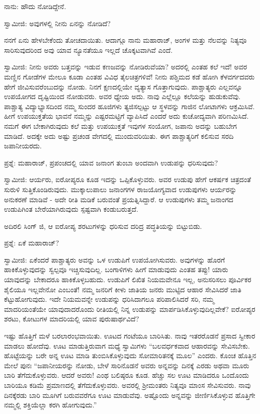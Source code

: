 ನಾನು: ಹೌದು ನೋಡಿದ್ದೇನೆ.

ಸ್ವಾಮೀಜಿ: ಅವುಗಳಲ್ಲಿ ನೀನು ಏನನ್ನು ನೋಡಿದೆ?

ನನಗೆ ಏನು ಹೇಳಬೇಕೆಂದು ತೋಚದಾಯಿತು. ಆದಾಗ್ಗೂ ನಾನು ಮಹಾರಾಜ್, ಅಂಗಳ ಮತ್ತು ನೆಲವನ್ನು ನಿತ್ಯವೂ ಸಾರಿಸುವುದರಿಂದ ಅವು ಯಾವ ನ್ಯೂನತೆಯೂ ಇಲ್ಲದೆ ಚೊಕ್ಕಟವಾಗಿವೆ ಎಂದೆ.

ಸ್ವಾಮೀಜಿ: ನೀನು ಅವರು ಬತ್ತವನ್ನು ಇಡುವ ಕಣಜವನ್ನು ನೋಡಿರುವೆಯಾ? ಅದರಲ್ಲಿ ಎಂತಹ ಕಲೆ ಇದೆ! ಅವರ ಮಣ್ಣಿನ ಗೋಡೆಗಳ ಮೇಲೂ ಕೂಡಾ ಎಂತಹ ವಿವಿಧ ತೈಲಚಿತ್ರಗಳಿವೆ! ನೀನು ಪಶ್ಚಿಮದ ಕಡೆ ಹೋಗಿ ಕೆಳವರ್ಗದವರು ಹೇಗೆ ಜೀವಿಸುವರೆಂಬುದನ್ನು ನೋಡು. ನಿನಗೆ ಕ್ಷಣದಲ್ಲಿಯೇ ವ್ಯತ್ಯಾಸ ಗೊತ್ತಾಗುವುದು. ಪಾಶ್ಚಾತ್ಯರು ಎಲ್ಲವನ್ನೂ ಉಪಯೋಗದ ದೃಷ್ಟಿಯಿಂದ ನೋಡುವರು. ಅವರ ಧ್ಯೇಯ ಅದು. ನಾವು ಎಲ್ಲೆಲ್ಲೂ ಕಲೆಯನ್ನು ಹುಡುಕುವೆವು. ಪಾಶ್ಚಾತ್ಯ ವಿದ್ಯಾಭ್ಯಾಸದಿಂದ ನಮ್ಮ ಸುಂದರ ಹೂಜಿಗಳು ತ್ಯಜಿಸಲ್ಪಟ್ಟು ಆ ಸ್ಥಳವನ್ನು ಗಾಜಿನ ಲೋಟಾಗಳು ಆಕ್ರಮಿಸಿವೆ. ಹೀಗೆ ಉಪಯುಕ್ತತೆಯ ಭಾವನೆ ನಮ್ಮನ್ನು ಎಷ್ಟರಮಟ್ಟಿಗೆ ವ್ಯಾಪಿಸಿದೆ ಎಂದರೆ ಅದು ಕುಚೋದ್ಯವಾಗಿ ಪರಿಣಮಿಸಿದೆ. ನಮಗೆ ಈಗ ಬೇಕಾಗಿರುವುದು ಕಲೆ ಮತ್ತು ಉಪಯುಕ್ತತೆ ಇವುಗಳ ಸಂಯೋಗ, ಜಪಾನು ಅದನ್ನು ಬಹುಬೇಗ ಮಾಡಿದೆ. ಅದಕ್ಕೇ ಅದು ಅಷ್ಟು ಪ್ರಚಂಡ ವೇಗದಲ್ಲಿ ಮುಂದುವರಿಯಿತು. ಈಗ ಪಾಶ್ಚಾತ್ಯರಿಗೆ ಕಲಿಸುವ ಸರದಿ ಜಪಾನೀಯರದು.

ಪ್ರಶ್ನೆ: ಮಹಾರಾಜ್, ಪ್ರಪಂಚದಲ್ಲಿ ಯಾವ ಜನಾಂಗ ತುಂಬಾ ಅಂದವಾಗಿ ಉಡುಪನ್ನು ಧರಿಸುವುದು?

ಸ್ವಾಮೀಜಿ: ಆರ್ಯರು, ಐರೋಪ್ಯರೂ ಕೂಡ ಇದನ್ನು ಒಪ್ಪಿಕೊಳ್ಳುವರು. ಅವರ ಉಡುಪು ಹೇಗೆ ಆಕರ್ಷಕ ಚಿತ್ರದಂತೆ ಸುರುಳಿ ಸುತ್ತಿಕೊಂಡಿರುವುದು. ಮುಕ್ಕಾಲುಪಾಲು ಜನಾಂಗಗಳ ರಾಜಯೋಗ್ಯವಾದ ಉಡುಪುಗಳು ಆರ್ಯರನ್ನು ಅನುಕರಣೆ ಮಾಡಿವೆ - ಅದೇ ರೀತಿ ಮಡಿಕೆ ಬರುವಂತೆ ಪ್ರಯತ್ನಿಸಿದ್ದಾರೆ. ಆ ಉಡುಪುಗಳು ತಮ್ಮ ಜನಾಂಗದ ಉಡುಪಿಗಿಂತ ಬೇರೆಯಾಗಿರುವುದು ಸ್ಪಷ್ಟವಾಗಿ ಕಂಡುಬರುತ್ತದೆ.

ಅದಿರಲಿ ಸಿಂಗ್ ಜಿ, ಆ ಐರೋಪ್ಯ ಶರಟುಗಳನ್ನು ಧರಿಸುವ ದರಿದ್ರ ಪದ್ಧತಿಯನ್ನು ಬಿಟ್ಟುಬಿಡು.

ಪ್ರಶ್ನೆ: ಏಕೆ ಮಹಾರಾಜ್?

ಸ್ವಾಮೀಜಿ: ಏಕೆಂದರೆ ಪಾಶ್ಚಾತ್ಯರು ಅವನ್ನು ಒಳ ಉಡುಪಿಗೆ ಉಪಯೋಗಿಸುವರು. ಅವುಗಳನ್ನು ಹೊರಗೆ ಹಾಕಿಕೊಳ್ಳುವುದನ್ನು ಸ್ವಲ್ಪವೂ ಇಚ್ಚಿಸುವುದಿಲ್ಲ. ಬಂಗಾಳಿಗಳು ಹೀಗೆ ಮಾಡುವುದು ಎಂತಹ ತಪ್ಪು! ಯಾರು ಯಾವುದನ್ನು ಬೇಕಾದರೂ ಹಾಕಿಕೊಳ್ಳಬಹುದು. ಉಡುಪಿಗೆ ಲಿಖಿತ ನಿಯಮವೇನೂ ಇಲ್ಲ, ಅನುಸರಿಸಲು ಪೂರ್ವಿಕರ ಶೈಲಿಯೂ ಇಲ್ಲವೇನೋ ಎಂಬಂತೆ! ನಮ್ಮ ಜನರಿಗೆ ಕೀಳು ಜಾತಿಯ ಜನರು ಮುಟ್ಟಿದ ಆಹಾರ ಸೇವಿಸಿದರೆ ಜಾತಿ ಕೆಟ್ಟುಹೋಗುವುದು. ಇದೇ ನಿಯಮವನ್ನೇ ಉಡುಪನ್ನು ಧರಿಸಿದಾಗಲೂ ಪರಿಪಾಲಿಸಿದರೆ ಸರಿ, ನಮ್ಮ ಮಾದರಿಯಂತೆಯೇ ಯಾವುದಾದರೊಂದು ರೀತಿಯಲ್ಲಿ ನಿನ್ನ ಉಡುಪನ್ನು ಮಾರ್ಪಡಿಸಿಕೊಳ್ಳುವುದಿಲ್ಲವೇಕೆ? ಐರೋಪ್ಯರ ಶರಟು, ಕೋಟುಗಳ ಮಾದರಿಯಲ್ಲಿ ಯಾವ ಪುರುಷಾರ್ಥವಿದೆ?

ಇಷ್ಟು ಹೊತ್ತಿಗೆ ಮಳೆ ಬರಲಾರಂಭವಾಯಿತು. ಊಟದ ಗಂಟೆಯೂ ಬಾರಿಸಿತು. ನಾವು ಇತರರೊಡನೆ ಪ್ರಸಾದ ಸ್ವೀಕಾರ ಮಾಡಲು ಹೋದೆವು. ಊಟ ಮಾಡುತ್ತಿರುವಾಗ ಮಧ್ಯೆ ಸ್ವಾಮಿಗಳು “ಬಲವರ್ಧಕವಾದ ಆಹಾರವನ್ನು ಸೇವಿಸಬೇಕು. ಹೊಟ್ಟೆಯನ್ನು ಬರೇ ಅನ್ನ ಊಟ ಮಾಡಿ ತುಂಬಿಸಿಕೊಳ್ಳುವುದು ಸೋಮಾರಿತನಕ್ಕೆ ಮೂಲ” ಎಂದರು. ಕೊಂಚ ಹೊತ್ತಿನ ಮೇಲೆ ಪುನಃ “ಜಪಾನೀಯರನ್ನು ನೋಡು, ಬೇಳೆ ಸಾರಿನೊಡನೆ ಅವರು ಅನ್ನವನ್ನು ದಿನಕ್ಕೆ ಎರಡು ಅಥವಾ ಮೂರು ಬಾರಿ ತೆಗೆದುಕೊಳ್ಳುವರು. ಆದರೆ ಅವರು! ಎಂಥ ಬಲಿಷ್ಠರೂ ಕೂಡ. ಹೆಚ್ಚು ಸಲ ಊಟ ಮಾಡಿದರೂ ಒಂದೊಂದು ಬಾರಿಯೂ ಕಡಿಮೆ ಪ್ರಮಾಣದಲ್ಲಿ ತೆಗೆದುಕೊಳ್ಳುವರು. ಅವರಲ್ಲಿ ಶ‍್ರೀಮಂತರು ನಿತ್ಯವೂ ಮಾಂಸ ಸೇವಿಸುವರು. ನಾವು ದಿನಕ್ಕೆರಡು ಬಾರಿ ಮೂಗಿಗೆ ಬರುವವರೆಗೂ ಊಟ ಮಾಡುವೆವು. ಅಷ್ಟೊಂದು ಅನ್ನವನ್ನು ಜೀರ್ಣಿಸಿಕೊಳ್ಳುವ ಹೊತ್ತಿಗೇ ನಮ್ಮಲ್ಲಿ ಶಕ್ತಿಯೆಲ್ಲಾ ಕರಗಿ ಹೋಗುವುದು.”

